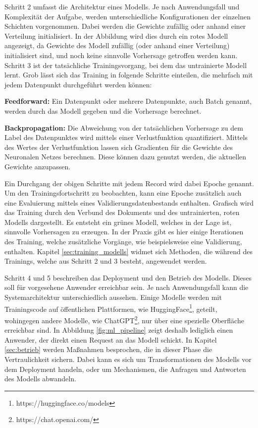 Schritt 2 umfasst die Architektur eines Modells.
Je nach Anwendungsfall und Komplexität der Aufgabe, werden unterschiedliche Konfigurationen der einzelnen Schichten vorgenommen.
Dabei werden die Gewichte zufällig oder anhand einer Verteilung initialisiert.
In der Abbildung wird dies durch ein rotes Modell angezeigt, da Gewichte des Modell zufällig (oder anhand einer Verteilung) initialisiert sind, und noch keine sinnvolle Vorhersage getroffen werden kann.
Schritt 3 ist der tatsächliche Trainingsvorgang, bei dem das untrainierte Modell lernt.
Grob lässt sich das Training in folgende Schritte einteilen, die mehrfach mit jedem Datenpunkt durchgeführt werden können:
\begin{compactenum}
\item \textbf{Feedforward: }Ein Datenpunkt oder mehrere Datenpunkte, auch Batch genannt, werden durch das Modell gegeben und die Vorhersage berechnet. 
\item \textbf{Backpropagation: }Die Abweichung von der tatsächlichen Vorhersage zu dem Label des Datenpunktes wird mittels einer Verlustfunktion quantifiziert. Mittels des Wertes der Verlustfunktion lassen sich Gradienten für die Gewichte des Neuronalen Netzes berechnen. Diese können dazu genutzt werden, die aktuellen Gewichte anzupassen. 
\end{compactenum}
Ein Durchgang der obigen Schritte mit jedem Record wird dabei Epoche genannt. 
Um den Trainingsfortschritt zu beobachten, kann eine Epoche zusätzlich auch eine Evaluierung mittels eines Validierungsdatenbestands enthalten.
Grafisch wird das Training durch den Verbund des Dokuments und des untrainierten, roten Modells dargestellt. 
Es entsteht ein grünes Modell, welches in der Lage ist, sinnvolle Vorhersagen zu erzeugen.
In der Praxis gibt es hier einige Iterationen des Training, welche zusätzliche Vorgänge, wie beispielsweise eine Validierung, enthalten. 
Kapitel \ref{sec:training_modells} widmet sich Methoden, die während des Trainings, welche aus Schritt 2 und 3 besteht, angewendet werden.

Schritt 4 und 5 beschreiben das Deployment und den Betrieb des Modells. 
Dieses soll für vorgesehene Anwender erreichbar sein. 
Je nach Anwendungsfall kann die Systemarchitektur unterschiedlich aussehen. 
Einige Modelle werden mit Trainingscode auf öffentlichen Plattformen, wie HuggingFace\footnote{https://huggingface.co/models}, geteilt, wohingegen andere Modelle, wie ChatGPT\footnote{https://chat.openai.com/}, nur über eine spezielle Oberfläche erreichbar sind.
In Abbildung \ref{fig:ml_pipeline} zeigt deshalb lediglich einen Anwender, der direkt einen Request an das Modell schickt.
In Kapitel \ref{sec:betrieb} werden Maßnahmen besprochen, die in dieser Phase die Vertraulichkeit sichern. 
Dabei kann es sich um Transformationen des Modells vor dem Deployment handeln, oder um Mechanismen, die Anfragen und Antworten des Modells abwandeln.